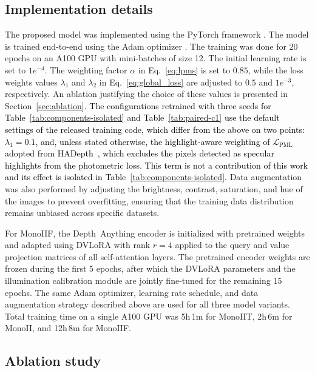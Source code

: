 \documentclass[a4paper,fleqn]{cas-dc}
\begin{document}
{\subsection{Implementation details}

The proposed model was implemented using the PyTorch framework \citep{pytorch_2019}. The model is trained end-to-end  using the Adam optimizer \citep{Adam_ICLR_2015}. The training was done for $20$ epochs on an A100 GPU with mini-batches of size 12. The initial learning rate is set to $1e^{-4}$. The weighting factor $\alpha$ in Eq.~\eqref{eq:lpms} is set to $0.85$, while the loss weights values $\lambda_1$ and $\lambda_2$ in Eq.~\eqref{eq:global_loss} are adjusted to $0.5$ and $1 e^{-3}$, respectively. An ablation justifying the choice of these values is presented in Section~\ref{sec:ablation}. \textcolor{black}{The configurations retrained with three seeds for Table~\ref{tab:components-isolated} and Table~\ref{tab:paired-c1} use the default settings of the released training code, which differ from the above on two points: $\lambda_1 = 0.1$, and, unless stated otherwise, the highlight-aware weighting of $\mathcal{L}_\textrm{PML}$ adopted from HADepth~\citep{HAdepth_2025}, which excludes the pixels detected as specular highlights from the photometric loss. This term is not a contribution of this work and its effect is isolated in Table~\ref{tab:components-isolated}.} Data augmentation was also performed by adjusting the brightness, contrast, saturation, and hue of the images to prevent overfitting,  ensuring that the training data distribution remains unbiased across specific datasets. 
%

For MonoIIF, the Depth~Anything encoder is initialized with pretrained weights and adapted using DVLoRA with 
rank $r=4$ applied to the query and value projection matrices of all self-attention layers. The pretrained 
encoder weights are frozen during the first 5 epochs, after which the DVLoRA parameters and the illumination 
calibration module are jointly fine-tuned for the remaining 15 epochs. The same Adam optimizer, learning 
rate schedule, and data augmentation strategy described above are used for all three model variants. Total 
training time on a single A100 GPU was 5h\,1m for MonoIIT, 2h\,6m for MonoII, and 12h\,8m for MonoIIF.
%
\subsection{Ablation study \label{sec:ablation}}
%

}
\end{document}
